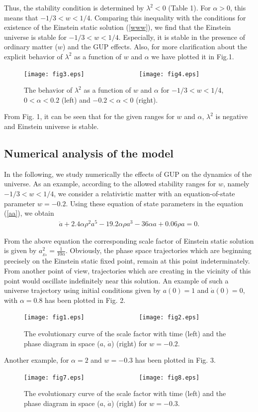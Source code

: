 \documentclass[showpacs,amsmath,nofootinbib,amssymb,epsfig]{revtex4}
\begin{document}
Thus, the stability condition is determined by $\lambda^{2}< 0$ (Table 1). For $\alpha> 0$, this means
that $-1/3 < w < 1/4$. Comparing this inequality with the conditions for existence of the Einstein
static solution (\ref{www}), we find that the Einstein universe is stable for $-1/3 < w < 1/4$.
Especially, it is stable in the presence of ordinary matter ($ w$) and the GUP effects.
Also, for more clarification about the explicit behavior of $\lambda^{2}$ as a function of $w$ and $\alpha$ we have plotted it in Fig.1.

\begin{figure*}[ht]
 \centering
\texttt{[image: fig3.eps]}~~~~~~~~~~~~~~~
   \texttt{[image: fig4.eps]}
  \caption{The behavior of $\lambda^{2}$ as a function of $w$ and $\alpha$ for $-1/3<w<1/4$, $0<\alpha<0.2$ (left) and  $-0.2<\alpha<0$ (right).}
 \label{stable1}
\end{figure*}
From Fig. 1, it can be seen that for the given ranges for $w$ and $\alpha$, $\lambda^{2}$ is negative and Einstein universe is stable.

\subsection{Numerical analysis of the model}
In the following, we study numerically the effects of GUP on the dynamics of the universe. As an example, according to the allowed stability ranges for $w$, namely $-1/3 < w < 1/4$, we consider
a relativistic matter with an equation-of-state parameter $w = -0.2$. Using these equation of
state parameters in the equation (\ref{aa}), we obtain
\begin{eqnarray}
\ddot{a}+2.4 \alpha  \rho ^2 a^5-19.2 \alpha  \rho  a^3-36 \alpha  a+0.06 \rho  a=0.
\end{eqnarray}

From the above equation the corresponding scale factor of Einstein static solution is given by $a^{2}_{_{Es}} = \frac{1}{10\alpha}$.
Obviously, the phase space trajectories which are beginning precisely on the Einstein static fixed point, remain at this point indeterminately. From another point of view, trajectories which are creating in the vicinity
of this point would oscillate indefinitely near this solution.
An example of such a universe trajectory using initial conditions given by $a(0) = 1$ and $\dot{a}(0) = 0$,
with $\alpha = 0.8$ has been plotted in Fig. 2.
\begin{figure*}[ht]
 \centering
\texttt{[image: fig1.eps]}~~~~~~~~~~~~~~~
   \texttt{[image: fig2.eps]}
  \caption{The evolutionary curve of the scale factor with time (left) and
the phase diagram  in space ($a$, $\dot{a}$) (right) for $w = -0.2$.}
 \label{stable}
\end{figure*}
Another example, for $\alpha = 2$ and $w = -0.3$ has been plotted in Fig. 3.
\begin{figure*}[ht]
 \centering
\texttt{[image: fig7.eps]}~~~~~~~~~~~~~~~
   \texttt{[image: fig8.eps]}
  \caption{The evolutionary curve of the scale factor with time (left) and
the phase diagram  in space ($a$, $\dot{a}$) (right) for $w = -0.3$.}
 \label{stable2}
\end{figure*}
\end{document}
